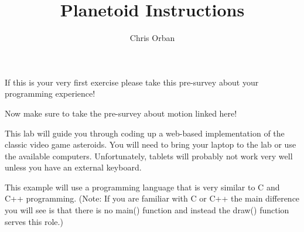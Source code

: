 \documentclass{ximera}
\author{Chris Orban}
\title{Planetoid Instructions}
\begin{document}
\maketitle

If this is your very first exercise please take this pre-survey about
your programming experience!

Now make sure to take the pre-survey about motion linked here!

This lab will guide you through coding up a web-based implementation
of the classic video game asteroids. You will need to bring your
laptop to the lab or use the available computers. Unfortunately,
tablets will probably not work very well unless you have an external
keyboard.

This example will use a programming language that is very similar to C
and C++ programming. (Note: If you are familiar with C or C++ the main
difference you will see is that there is no main() function and
instead the draw() function serves this role.)
\end{document}

